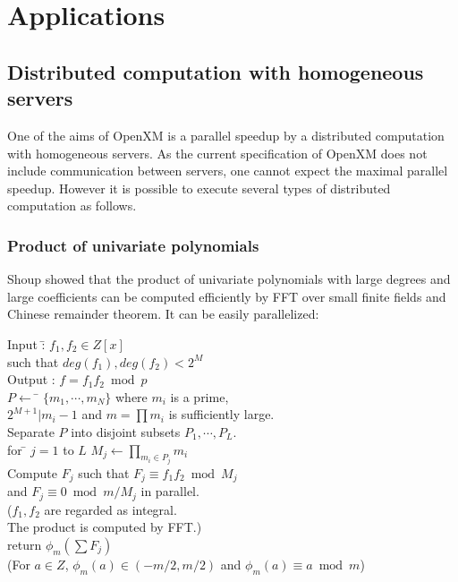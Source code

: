 
\section{Applications}
\subsection{Distributed computation with homogeneous servers}

One of the aims of OpenXM is a parallel speedup by a distributed computation
with homogeneous servers. As the current specification of OpenXM does
not include communication between servers, one cannot expect
the maximal parallel speedup. However it is possible to execute
several types of distributed computation as follows.

\subsubsection{Product of univariate polynomials}

Shoup \cite{Shoup} showed that the product of univariate polynomials
with large degrees and large coefficients can be computed efficiently
by FFT over small finite fields and Chinese remainder theorem.
It can be easily parallelized:

\begin{tabbing}
Input :\= $f_1, f_2 \in Z[x]$\\
\> such that $deg(f_1), deg(f_2) < 2^M$\\
Output : $f = f_1f_2 \bmod p$\\
$P \leftarrow$ \= $\{m_1,\cdots,m_N\}$ where $m_i$ is a prime, \\
\> $2^{M+1}|m_i-1$ and $m=\prod m_i $ is sufficiently large. \\
Separate $P$ into disjoint subsets $P_1, \cdots, P_L$.\\
for \= $j=1$ to $L$ $M_j \leftarrow \prod_{m_i\in P_j} m_i$\\
Compute $F_j$ such that $F_j \equiv f_1f_2 \bmod M_j$\\
\> and $F_j \equiv 0 \bmod m/M_j$ in parallel.\\
\> ($f_1, f_2$ are regarded as integral.\\
\> The product is computed by FFT.)\\
return $\phi_m(\sum F_j)$\\
(For $a \in Z$, $\phi_m(a) \in (-m/2,m/2)$ and $\phi_m(a)\equiv a \bmod m$)
\end{tabbing}

